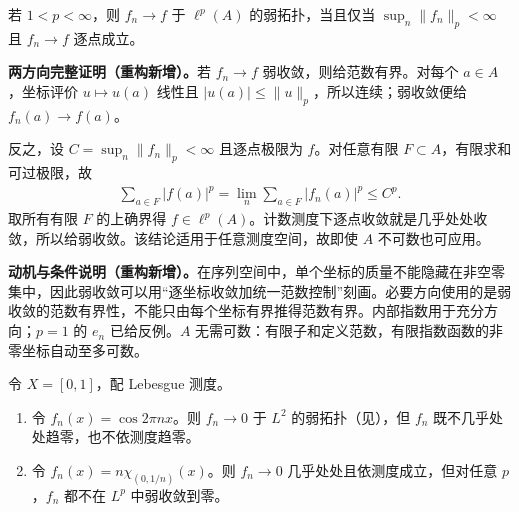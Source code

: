 \documentclass[../../main.tex]{subfiles}
\begin{document}
\begin{exercise}\label{exercise:ch06-sequence-weak-convergence}
若 $1<p<\infty$，则 $f_n\to f$ 于 $\ell^p(A)$ 的弱拓扑，当且仅当 $\sup_n\|f_n\|_p<\infty$ 且 $f_n\to f$ 逐点成立。
\end{exercise}
\begin{solution}
\textbf{两方向完整证明（重构新增）。}若 $f_n\to f$ 弱收敛，则给范数有界。对每个 $a\in A$，坐标评价 $u\mapsto u(a)$ 线性且 $|u(a)|\leqslant\|u\|_p$，所以连续；弱收敛便给 $f_n(a)\to f(a)$。

反之，设 $C=\sup_n\|f_n\|_p<\infty$ 且逐点极限为 $f$。对任意有限 $F\subset A$，有限求和可过极限，故
\begin{align*}
\sum_{a\in F}|f(a)|^p=\lim_n\sum_{a\in F}|f_n(a)|^p\leqslant C^p.
\end{align*}
取所有有限 $F$ 的上确界得 $f\in\ell^p(A)$。计数测度下逐点收敛就是几乎处处收敛，所以给弱收敛。该结论适用于任意测度空间，故即使 $A$ 不可数也可应用。
\end{solution}
\begin{remark}
\textbf{动机与条件说明（重构新增）。}在序列空间中，单个坐标的质量不能隐藏在非空零集中，因此弱收敛可以用“逐坐标收敛加统一范数控制”刻画。必要方向使用的是弱收敛的范数有界性，不能只由每个坐标有界推得范数有界。内部指数用于充分方向；$p=1$ 的 $e_n$ 已给反例。$A$ 无需可数：有限子和定义范数，有限指数函数的非零坐标自动至多可数。
\end{remark}
\begin{exercise}\label{exercise:ch06-weak-ae-measure-examples}
令 $X=[0,1]$，配 Lebesgue 测度。
\begin{enumerate}
\item\label{item:ch06-cosine-weak-example} 令 $f_n(x)=\cos2\pi nx$。则 $f_n\to0$ 于 $L^2$ 的弱拓扑（见），但 $f_n$ 既不几乎处处趋零，也不依测度趋零。
\item\label{item:ch06-spike-weak-example} 令 $f_n(x)=n\chi_{(0,1/n)}(x)$。则 $f_n\to0$ 几乎处处且依测度成立，但对任意 $p$，$f_n$ 都不在 $L^p$ 中弱收敛到零。
\end{enumerate}
\end{exercise}
\end{document}
